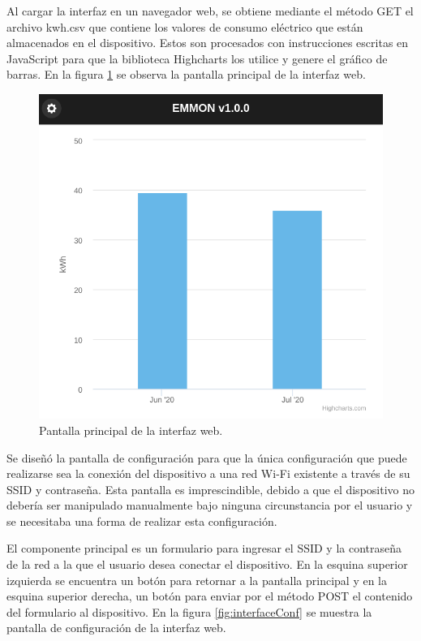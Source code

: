 Al cargar la interfaz en un navegador web, se obtiene mediante el método GET el archivo kwh.csv que contiene los valores de consumo eléctrico que están almacenados en el dispositivo. Estos son procesados con instrucciones escritas en JavaScript para que la biblioteca Highcharts los utilice y genere el gráfico de barras. En la figura \ref{fig:interfaceMain} se observa la pantalla principal de la interfaz web.

\begin{figure}[h]
	\centering
	\includegraphics[scale=0.35]{./Figures/interface_main.png}
	\caption{Pantalla principal de la interfaz web.}
	\label{fig:interfaceMain}
\end{figure}

Se diseñó la pantalla de configuración para que la única configuración que puede realizarse sea la conexión del dispositivo a una red Wi-Fi existente a través de su SSID y contraseña. Esta pantalla es imprescindible, debido a que el dispositivo no debería ser manipulado manualmente bajo ninguna circunstancia por el usuario y se necesitaba una forma de realizar esta configuración.

El componente principal es un formulario para ingresar el SSID y la contraseña de la red a la que el usuario desea conectar el dispositivo. En la esquina superior izquierda se encuentra un botón para retornar a la pantalla principal y en la esquina superior derecha, un botón para enviar por el método POST el contenido del formulario al dispositivo. En la figura \ref{fig:interfaceConf} se muestra la pantalla de configuración de la interfaz web.

